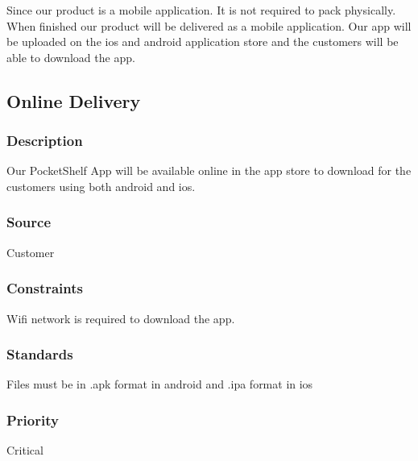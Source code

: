 Since our product is a mobile application. It is not required to pack physically. When finished our product will be delivered as a mobile application. Our app will be uploaded on the ios and android application store and the customers will be able to download the app.

\subsection{Online Delivery}
\subsubsection{Description}
Our PocketShelf App will be available online in the app store to download for the customers using both android and ios.
\subsubsection{Source}
Customer
\subsubsection{Constraints}
Wifi network is required to download the app.
\subsubsection{Standards}
Files must be in .apk format in android and .ipa format in ios
\subsubsection{Priority}
Critical